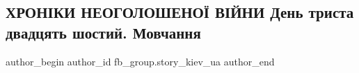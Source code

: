  
 
 
 
 

\subsection{ХРОНІКИ НЕОГОЛОШЕНОЇ ВІЙНИ  День триста двадцять шостий. Мовчання}
\label{sec:15_01_2023.fb.fb_group.story_kiev_ua.1.khron_ki_neogoloshen}

\ifcmt
 author_begin
   author_id fb_group.story_kiev_ua
 author_end
\fi
